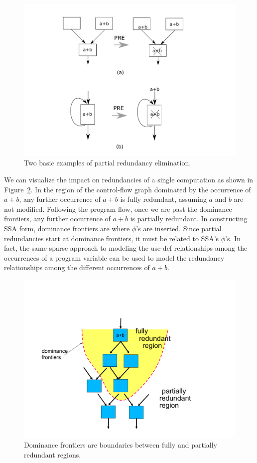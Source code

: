 \begin{figure}
\centering
\includegraphics[scale=0.45]{fig-pre-examples.pdf}
\caption{Two basic examples of partial redundancy elimination.}
\label{fig: pre-examples}
\end{figure}

We can visualize the impact on redundancies of a single computation
as shown in Figure~\ref{fig: ssapre-motive}.  
In the region of the control-flow graph dominated by the occurrence of $a+b$, 
any further occurrence of $a+b$ is fully redundant, assuming $a$ and $b$ are
not modified.  Following the program flow,
once we are past the dominance frontiers, any further occurrence of $a+b$ is
partially redundant.  In constructing SSA form, dominance frontiers are where
$\phi$'s are inserted.   Since partial redundancies start at dominance
frontiers, it must be related to SSA's $\phi$'s.  In fact, the same sparse
approach to modeling the use-def relationships among the occurrences of
a program variable can be used to model the redundancy relationships among 
the different occurrences of $a+b$.

\begin{figure}
\centering
\includegraphics[scale=0.35]{fig-ssapre-motive.pdf}
\caption{Dominance frontiers are boundaries between fully and partially redundant regions.}
\label{fig: ssapre-motive}
\end{figure}

